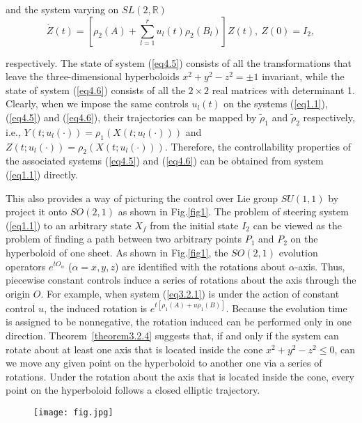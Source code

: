 \documentclass[onecolumn,showpacs,showkeys,preprintnumbers]{revtex4}
\begin{document}
\noindent and the system varying on $SL(2,\mathbb{R})$\noindent\begin{equation}\label{eq4.6}
\dot{Z}(t)=[\rho_2(A)+\sum_{l=1}^{r}u_l(t)\rho_2(B_l)]Z(t),~Z(0)=I_2,
\end{equation}

\noindent respectively. The state of system (\ref{eq4.5}) consists
of all the transformations that leave the three-dimensional
hyperboloids $x^2+y^2-z^2=\pm1$ invariant, while the state of
system (\ref{eq4.6}) consists of all the $2\times2$ real matrices
with determinant 1. Clearly, when we impose the same controls
$u_l(t)$ on the systems (\ref{eq1.1}), (\ref{eq4.5}) and
(\ref{eq4.6}), their trajectories can be mapped by
$\tilde{\rho}_1$ and $\tilde{\rho}_2$ respectively, i.e.,
$Y(t;u_l(\cdot))=\rho_1(X(t;u_l(\cdot)))$ and
$Z(t;u_l(\cdot))=\rho_2(X(t;u_l(\cdot)))$. Therefore, the
controllability properties of the associated systems (\ref{eq4.5})
and (\ref{eq4.6}) can be obtained from system (\ref{eq1.1})
directly.

This also provides a way of picturing the control over Lie group
$SU(1,1)$ by project it onto $SO(2,1)$ as shown in Fig.\ref{fig1}.
The problem of steering system (\ref{eq1.1}) to an arbitrary state
$X_f$ from the initial state $I_2$ can be viewed as the problem of
finding a path between two arbitrary points $P_1$ and $P_2$ on the
hyperboloid of one sheet. As shown in Fig.\ref{fig1}, the
$SO(2,1)$ evolution operators $e^{tO_{\alpha}}$ ($\alpha=x,y,z$)
are identified with the rotations about $\alpha$-axis. Thus,
piecewise constant controls induce a series of rotations about the
axis through the origin $O$. For example, when system
(\ref{eq3.2.1}) is under the action of constant control $u$, the
induced rotation is $e^{t[\rho_1(A)+u\rho_1(B)]}$. Because the
evolution time is assigned to be nonnegative, the rotation induced
can be performed only in one direction. Theorem~\ref{theorem3.2.4}
suggests that, if and only if the system can rotate about at least
one axis that is located inside the cone $x^2+y^2-z^2\leq0$, can
we move any given point on the hyperboloid to another one via a
series of rotations. Under the rotation about the axis that is
located inside the cone, every point on the hyperboloid follows a
closed
elliptic trajectory.\noindent\begin{center} \noindent\begin{figure}[h] \centering
\texttt{[image: fig.jpg]}
\end{figure}
\end{center}\noindent
\end{document}
